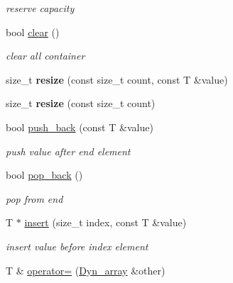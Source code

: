 \begin{DoxyCompactItemize}
\begin{DoxyCompactList}\small\item\em reserve capacity \end{DoxyCompactList}\item 
\mbox{\label{classDyn__array_aa7dee5a6c9f658532f9175b45d3f24e5}} 
bool \hyperlink{classDyn__array_aa7dee5a6c9f658532f9175b45d3f24e5}{clear} ()
\begin{DoxyCompactList}\small\item\em clear all container \end{DoxyCompactList}\item 
\mbox{\label{classDyn__array_a2412c58d9a14876406e4f0ca10722020}} 
size\+\_\+t {\bfseries resize} (const size\+\_\+t count, const T \&value)
\item 
\mbox{\label{classDyn__array_a3eefab6e61af85f898727d5a44ecf0ec}} 
size\+\_\+t {\bfseries resize} (const size\+\_\+t count)
\item 
bool \hyperlink{classDyn__array_a24797d477a7655bf37d1b1dd97eac1e3}{push\+\_\+back} (const T \&value)
\begin{DoxyCompactList}\small\item\em push value after end element \end{DoxyCompactList}\item 
\mbox{\label{classDyn__array_ac28c19e9c075fe6a72cf9fcaeed70d90}} 
bool \hyperlink{classDyn__array_ac28c19e9c075fe6a72cf9fcaeed70d90}{pop\+\_\+back} ()
\begin{DoxyCompactList}\small\item\em pop from end \end{DoxyCompactList}\item 
T $\ast$ \hyperlink{classDyn__array_a4b261db6ebc4b4b13136e262c955c71a}{insert} (size\+\_\+t index, const T \&value)
\begin{DoxyCompactList}\small\item\em insert value before index element \end{DoxyCompactList}\item 
\mbox{\label{classDyn__array_a3038b3c6558794e168a7a5d7f58a3701}} 
T \& \hyperlink{classDyn__array_a3038b3c6558794e168a7a5d7f58a3701}{operator=} (\hyperlink{classDyn__array}{Dyn\+\_\+array} \&other)

\end{DoxyCompactItemize}
